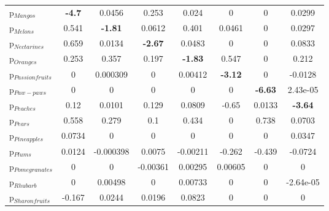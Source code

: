 \documentclass[11pt]{article}
\begin{document}
\begin{table}[h]
\begin{center}
\begin{tabular}{lccccccc}
p$_{Mangos}$ &\textbf{-4.7} &0.0456 &0.253 &0.024 &0 &0 &0.0299 \\
p$_{Melons}$ &0.541 &\textbf{-1.81} &0.0612 &0.401 &0.0461 &0 &0.0297 \\
p$_{Nectarines}$ &0.659 &0.0134 &\textbf{-2.67} &0.0483 &0 &0 &0.0833 \\
p$_{Oranges}$ &0.253 &0.357 &0.197 &\textbf{-1.83} &0.547 &0 &0.212 \\
p$_{Passion fruits}$ &0 &0.000309 &0 &0.00412 &\textbf{-3.12} &0 &-0.0128 \\
p$_{Paw-paws}$ &0 &0 &0 &0 &0 &\textbf{-6.63} &2.43e-05 \\
p$_{Peaches}$ &0.12 &0.0101 &0.129 &0.0809 &-0.65 &0.0133 &\textbf{-3.64} \\
p$_{Pears}$ &0.558 &0.279 &0.1 &0.434 &0 &0.738 &0.0703 \\
p$_{Pineapples}$ &0.0734 &0 &0 &0 &0 &0 &0.0347 \\
p$_{Plums}$ &0.0124 &-0.000398 &0.0075 &-0.00211 &-0.262 &-0.439 &-0.0724 \\
p$_{Pomegranates}$ &0 &0 &-0.00361 &0.00295 &0.00605 &0 &0 \\
p$_{Rhubarb}$ &0 &0.00498 &0 &0.00733 &0 &0 &-2.64e-05 \\
p$_{Sharon fruits}$ &-0.167 &0.0244 &0.0196 &0.0823 &0 &0 &0 \\
\end{tabular}
\end{center}
\end{table}
\end{document}

